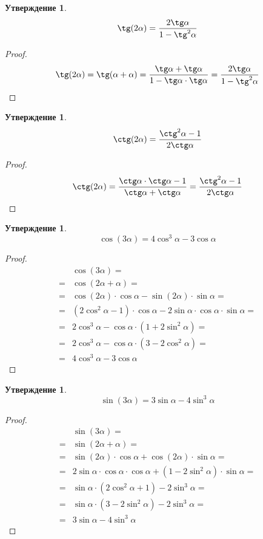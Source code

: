 \documentclass[12pt]{article}
\theoremstyle{definition}
\newtheorem{statement}[theorem]{Утверждение}
\begin{document}
    \begin{statement}
        $$\tg(2\alpha)=\dfrac{2\tg\alpha}{1-\tg^2\alpha}$$
    \end{statement}
    \begin{proof}
        $$\tg(2\alpha)=\tg(\alpha+\alpha)=\dfrac{\tg\alpha+\tg\alpha}{1-\tg\alpha\cdot\tg\alpha}=\dfrac{2\tg\alpha}{1-\tg^2\alpha}$$
    \end{proof}
    \begin{statement}
        $$\ctg(2\alpha)=\dfrac{\ctg^2\alpha-1}{2\ctg\alpha}$$
    \end{statement}
    \begin{proof}
        $$\ctg(2\alpha)=\dfrac{\ctg\alpha\cdot\ctg\alpha-1}{\ctg\alpha+\ctg\alpha}=\dfrac{\ctg^2\alpha-1}{2\ctg\alpha}$$
    \end{proof}
    \begin{statement}
        $$\cos(3\alpha)=4\cos^3\alpha-3\cos\alpha$$
    \end{statement}
    \begin{proof}
        \begin{align*}
            &\cos(3\alpha)=\\
            =&\cos(2\alpha+\alpha)=\\
            =&\cos(2\alpha)\cdot\cos\alpha-\sin(2\alpha)\cdot\sin\alpha=\\
            =&(2\cos^2\alpha-1)\cdot\cos\alpha-2\sin\alpha\cdot\cos\alpha\cdot\sin\alpha=\\
            =&2\cos^3\alpha-\cos\alpha\cdot(1+2\sin^2\alpha)=\\
            =&2\cos^3\alpha-\cos\alpha\cdot(3-2\cos^2\alpha)=\\
            =&4\cos^3\alpha-3\cos\alpha
        \end{align*}
    \end{proof}
    \begin{statement}
        $$\sin(3\alpha)=3\sin\alpha-4\sin^3\alpha$$
    \end{statement}
    \begin{proof}
        \begin{align*}
            &\sin(3\alpha)=\\
            =&\sin(2\alpha+\alpha)=\\
            =&\sin(2\alpha)\cdot\cos\alpha+\cos(2\alpha)\cdot\sin\alpha=\\
            =&2\sin\alpha\cdot\cos\alpha\cdot\cos\alpha+(1-2\sin^2\alpha)\cdot\sin\alpha=\\
            =&\sin\alpha\cdot(2\cos^2\alpha+1)-2\sin^3\alpha=\\
            =&\sin\alpha\cdot(3-2\sin^2\alpha)-2\sin^3\alpha=\\
            =&3\sin\alpha-4\sin^3\alpha
        \end{align*}
    \end{proof}
\end{document}
